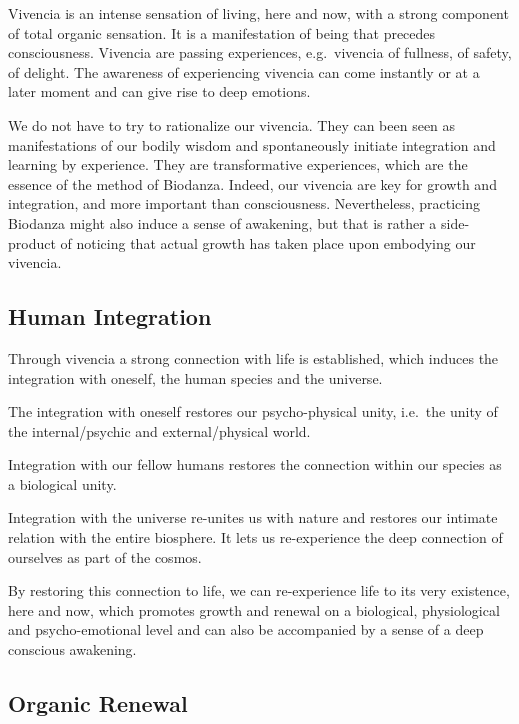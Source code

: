 \documentclass[
  11pt,
]{book}
\begin{document}
Vivencia is an intense sensation of living, here and now, with a strong component of total organic sensation. It is a manifestation of being that precedes consciousness. Vivencia are passing experiences, e.g.~vivencia of fullness, of safety, of delight. The awareness of experiencing vivencia can come instantly or at a later moment and can give rise to deep emotions.

We do not have to try to rationalize our vivencia. They can been seen as manifestations of our bodily wisdom and spontaneously initiate integration and learning by experience. They are transformative experiences, which are the essence of the method of Biodanza. Indeed, our vivencia are key for growth and integration, and more important than consciousness. Nevertheless, practicing Biodanza might also induce a sense of awakening, but that is rather a side-product of noticing that actual growth has taken place upon embodying our vivencia.

\hypertarget{human-integration}{%
\subsection{Human Integration}\label{human-integration}}

Through vivencia a strong connection with life is established, which induces the integration with oneself, the human species and the universe.

The integration with oneself restores our psycho-physical unity, i.e.~the unity of the internal/psychic and external/physical world.

Integration with our fellow humans restores the connection within our species as a biological unity.

Integration with the universe re-unites us with nature and restores our intimate relation with the entire biosphere.
It lets us re-experience the deep connection of ourselves as part of the cosmos.

By restoring this connection to life, we can re-experience life to its very existence, here and now, which promotes growth and renewal on a biological, physiological and psycho-emotional level and can also be accompanied by a sense of a deep conscious awakening.

\hypertarget{organic-renewal}{%
\subsection{Organic Renewal}\label{organic-renewal}}
\end{document}
